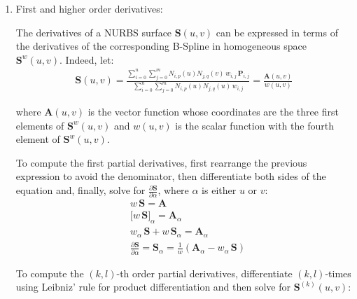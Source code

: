 \begin{enumerate}
    This property is important to evaluate the derivatives of NURBS surfaces.
    
    \item First and higher order derivatives:
    
    The derivatives of a NURBS surface $\mathbf{S}(u,v)$ can be expressed in terms of the derivatives of the corresponding B-Spline in homogeneous space $\mathbf{S}^{w}(u,v)$. Indeed, let:
    \begin{align*}
        \mathbf{S}(u,v) = \frac{\sum\limits_{i=0}^{n}\sum\limits_{j=0}^{m} N_{i,p}(u)N_{j,q}(v)\, w_{i,j} \,\mathbf{P}_{i,j}}{\sum\limits_{i=0}^{n} \sum\limits_{j=0}^{m} N_{i,p}(u)N_{j,q}(u)\, w_{i,j}} = \frac{\mathbf{A}(u,v)}{w(u,v)}
    \end{align*}
    
    where $\mathbf{A}(u,v)$ is the vector function whose coordinates are the three first elements of $\mathbf{S}^{w}(u,v)$ and $w(u,v)$ is the scalar function with the fourth element of $\mathbf{S}^{w}(u,v)$.
    
    To compute the first partial derivatives, first rearrange the previous expression to avoid the denominator, then differentiate both sides of the equation and, finally, solve for $\frac{\partial\mathbf{S}}{\partial \alpha}$, where $\alpha$ is either $u$ or $v$:
    \begin{align*}
        & w \, \mathbf{S} = \mathbf{A} \\
        & \big[ w \, \mathbf{S} \big]_{\alpha}  = \mathbf{A}_{\alpha} \\
        & w_{\alpha} \, \mathbf{S} + w \, \mathbf{S}_{\alpha} = \mathbf{A}_{\alpha} \\
        & \frac{\partial \mathbf{S}}{\partial \alpha} = \mathbf{S}_{\alpha} = \frac{1}{w} \left( \mathbf{A}_{\alpha} - w_{\alpha} \, \mathbf{S} \right)
    \end{align*}
    
    To compute the $(k,l)$-th order partial derivatives, differentiate $(k,l)$-times using Leibniz' rule for product differentiation and then solve for $\mathbf{S}^{(k)}(u,v)$: 
    
    

\end{enumerate}
